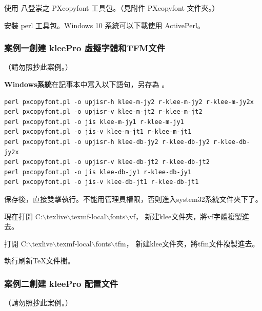 \par{}使用 八登崇之 PXcopyfont 工具包。（見附件 PXcopyfont 文件夾。）
\par{}安裝 perl 工具包。Windows 10 系統可以下載使用 {ActivePerl}。

\subsubsection*{案例一創建 {kleePro} 虛擬字體和TFM文件}

（請勿照抄此案例。）

\par{}{\bfseries{Windows系統}}在記事本中寫入以下語句，另存為 。
\begin{lstlisting}[firstnumber=1]
perl pxcopyfont.pl -o upjisr-h klee-m-jy2 r-klee-m-jy2 r-klee-m-jy2x
perl pxcopyfont.pl -o upjisr-v klee-m-jt2 r-klee-m-jt2
perl pxcopyfont.pl -o jis klee-m-jy1 r-klee-m-jy1
perl pxcopyfont.pl -o jis-v klee-m-jt1 r-klee-m-jt1
perl pxcopyfont.pl -o upjisr-h klee-db-jy2 r-klee-db-jy2 r-klee-db-jy2x
perl pxcopyfont.pl -o upjisr-v klee-db-jt2 r-klee-db-jt2
perl pxcopyfont.pl -o jis klee-db-jy1 r-klee-db-jy1
perl pxcopyfont.pl -o jis-v klee-db-jt1 r-klee-db-jt1
\end{lstlisting}

\par{}保存後，直接雙擊執行。不能用管理員權限，否則進入system32系統文件夾下了。
\par{}現在打開
{\color{red}C:$\backslash$texlive$\backslash$texmf-local$\backslash$fonts$\backslash$vf}，
新建klee文件夾，將vf字體複製進去。
\par{}打開
{\color{red}C:$\backslash$texlive$\backslash$texmf-local$\backslash$fonts$\backslash$tfm}，
新建klee文件夾，將tfm文件複製進去。
\par{}執行刷新{\TeX}文件樹。


\subsubsection*{案例二創建 {kleePro} 配置文件}

（請勿照抄此案例。）

